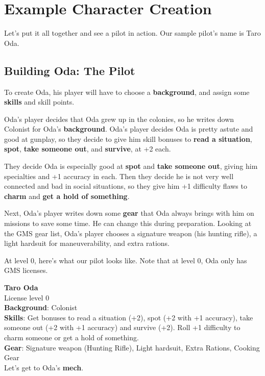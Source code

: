 \section{Example Character Creation}


Let’s put it all together and see a pilot in action. Our sample pilot’s name is Taro Oda.

\subsection{Building Oda: The Pilot}

To create Oda, his player will have to choose a \textbf{background}, and assign some \textbf{skills} and skill points.


Oda’s player decides that Oda grew up in the colonies, so he writes down Colonist for Oda’s \textbf{background}. Oda’s player decides Oda is pretty astute and good at gunplay, so they decide to give him skill bonuses to \textbf{read a situation}, \textbf{spot}, \textbf{take someone out}, and \textbf{survive}, at +2 each.

They decide Oda is especially good at \textbf{spot} and \textbf{take someone out}, giving him specialties and +1 accuracy in each. Then they decide he is not very well connected and bad in social situations, so they give him +1 difficulty flaws to \textbf{charm} and \textbf{get a hold of something}.

Next, Oda’s player writes down some \textbf{gear} that Oda always brings with him on missions to save some time. He can change this during preparation. Looking at the GMS gear list, Oda’s player chooses a signature weapon (his hunting rifle), a light hardsuit for maneuverability, and extra rations.

At level 0, here’s what our pilot looks like. Note that at level 0, Oda only has GMS licenses.

\textbf{Taro Oda}\\
License level 0\\
\textbf{Background}: Colonist\\
\textbf{Skills}: Get bonuses to read a situation (+2), spot (+2 with +1 accuracy), take someone out (+2 with +1 accuracy) and survive (+2). Roll +1 difficulty to charm someone or get a hold of something.\\
\textbf{Gear}: Signature weapon (Hunting Rifle), Light hardsuit, Extra Rations, Cooking Gear\\

Let’s get to Oda’s \textbf{mech}.

